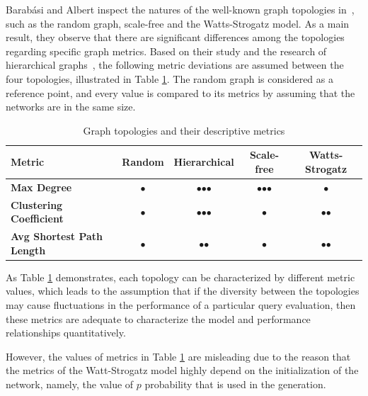 Barabási and Albert inspect the natures of the well-known graph topologies in~\cite{statistical_mechanics}, such as the random graph, scale-free and the Watts-Strogatz model. As a main result, they observe that there are significant differences among the topologies regarding specific graph metrics. Based on their study and the research of hierarchical graphs~\cite{hierarchical}, the following metric deviations are assumed	between the four topologies, illustrated in Table \ref{tab:topology_metrics}. The random graph is considered as a reference point, and every value is compared to its metrics by assuming that the networks are in the same size.
\begin{table}[ht]
	\footnotesize
	\centering
	\begin{tabular}{ l c c c c}
		\toprule
		Metric & Random & Hierarchical & Scale-free & Watts-Strogatz \\ 
		\midrule 
		\textbf{Max Degree} & $\bullet$ & $\bullet$$\bullet$$\bullet$ & $\bullet$$\bullet$$\bullet$ & $\bullet$ \\ \hline
		\textbf{Clustering Coefficient} & $\bullet$ & $\bullet$$\bullet$$\bullet$ & $\bullet$ & $\bullet$$\bullet $\\ \hline
		\textbf{Avg Shortest Path Length} & $\bullet$ & $\bullet$$\bullet$ & $\bullet$ & $\bullet$$\bullet$ \\ \hline
		\bottomrule
	\end{tabular}
	\caption{Graph topologies and their descriptive metrics}
	\label{tab:topology_metrics}
\end{table}
As Table \ref{tab:topology_metrics} demonstrates, each topology can be characterized by different metric values, which leads to the assumption that if the diversity between the topologies may cause fluctuations in the performance of a particular query evaluation, then these metrics are adequate to characterize the model and performance relationships quantitatively.


However, the values of metrics in Table \ref{tab:topology_metrics} are misleading due to the reason that the metrics of the Watt-Strogatz model highly depend on the initialization of the network, namely, the value of $p$ probability that is used in the generation.

